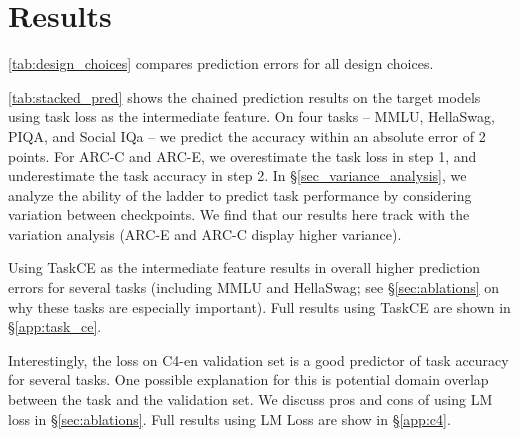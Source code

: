 \section{Results}
\label{sec:results}


%



\autoref{tab:design_choices} compares prediction errors for all design choices. 

\autoref{tab:stacked_pred} shows the chained prediction results on the target models using task loss as the intermediate feature.
On four tasks -- MMLU, HellaSwag, PIQA, and Social IQa -- we predict the accuracy within an absolute error of 2 points.
For ARC-C and ARC-E, we overestimate the task loss in step 1, and underestimate the task accuracy in step 2. In \S\ref{sec_variance_analysis}, we analyze the ability of the ladder to predict task performance by considering variation between checkpoints. We find that our results here track with the variation analysis (ARC-E and ARC-C display higher variance).


Using TaskCE as the intermediate feature results in overall higher prediction errors for several tasks (including MMLU and HellaSwag; see \S\ref{sec:ablations} on why these tasks are especially important). Full results using TaskCE are shown in \S\ref{app:task_ce}.

Interestingly, the loss on C4-en validation set is a good predictor of task accuracy for several tasks. One possible explanation for this is potential domain overlap between the task and the validation set. We discuss pros and cons of using LM loss in \S\ref{sec:ablations}. Full results using LM Loss are show in \S\ref{app:c4}.

